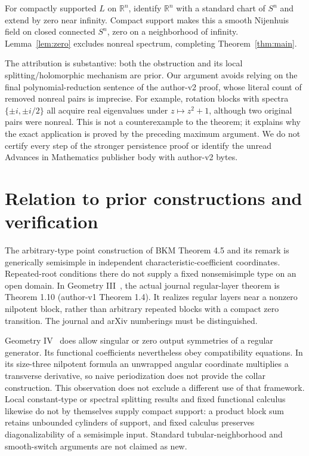 \documentclass[11pt]{article}
\newcommand{\R}{\mathbb R}
\begin{document}
For compactly supported $L$ on $\R^n$, identify $\R^n$ with a standard
chart of $S^n$ and extend by zero near infinity. Compact support makes this
a smooth Nijenhuis field on closed connected $S^n$, zero on a neighborhood
of infinity. Lemma~\ref{lem:zero} excludes nonreal spectrum, completing
Theorem~\ref{thm:main}.

The attribution is substantive: both the obstruction and its local
splitting/holomorphic mechanism are prior. Our argument avoids relying on
the final polynomial-reduction sentence of the author-v2 proof, whose
literal count of removed nonreal pairs is imprecise. For example, rotation
blocks with spectra $\{\pm i,\pm i/2\}$ all acquire real eigenvalues under
$z\mapsto z^2+1$, although two original pairs were nonreal. This is not a
counterexample to the theorem; it explains why the exact application is
proved by the preceding maximum argument. We do not certify every step of
the stronger persistence proof or identify the unread Advances in
Mathematics publisher body with author-v2 bytes.

\section{Relation to prior constructions and verification}
The arbitrary-type point construction of BKM Theorem 4.5 and its remark
is generically semisimple in independent characteristic-coefficient
coordinates. Repeated-root conditions there do not supply a fixed
nonsemisimple type on an open domain. In Geometry III~\cite{bkm3}, the
actual journal regular-layer theorem is Theorem 1.10 (author-v1 Theorem
1.4). It realizes regular layers near a nonzero nilpotent block, rather
than arbitrary repeated blocks with a compact zero transition. The journal
and arXiv numberings must be distinguished.

Geometry IV~\cite{bkm4} does allow singular or zero output symmetries of a
regular generator. Its functional coefficients nevertheless obey
compatibility equations. In its size-three nilpotent formula an unwrapped
angular coordinate multiplies a transverse derivative, so naive
periodization does not provide the collar construction. This observation
does not exclude a different use of that framework. Local constant-type
or spectral splitting results and fixed functional calculus likewise do
not by themselves supply compact support: a product block sum retains
unbounded cylinders of support, and fixed calculus preserves
diagonalizability of a semisimple input. Standard tubular-neighborhood and
smooth-switch arguments are not claimed as new.
\end{document}
